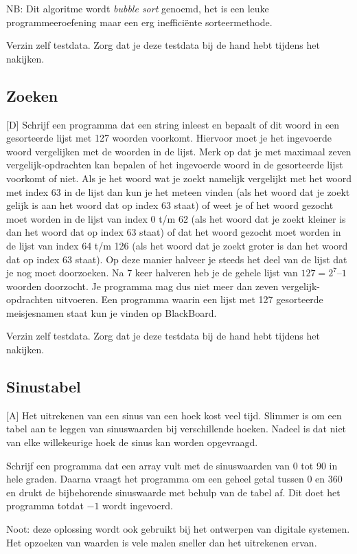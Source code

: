 \documentclass[a4paper,10pt,fleqn,twoside]{article}
\begin{document}
NB: Dit algoritme wordt \textsl{bubble sort} genoemd, het is een leuke programmeeroefening maar een erg inefficiënte sorteermethode.

Verzin zelf testdata. Zorg dat je deze testdata bij de hand hebt tijdens het nakijken.

\subsection{Zoeken}[D]
Schrijf een programma dat een string inleest en bepaalt of dit woord in een gesorteerde lijst met 127 woorden voorkomt. Hiervoor moet je het ingevoerde woord vergelijken met de woorden in de lijst. Merk op dat je met maximaal zeven vergelijk-opdrachten kan bepalen of het ingevoerde woord in de gesorteerde lijst voorkomt of niet. Als je het woord wat je zoekt namelijk vergelijkt met het woord met index 63 in de lijst dan kun je het meteen vinden (als het woord dat je zoekt gelijk is aan het woord dat op index 63 staat) of weet je of het woord gezocht moet worden in de lijst van index 0 t/m 62 (als het woord dat je zoekt kleiner is dan het woord dat op index 63 staat) of dat het woord gezocht moet worden in de lijst van index 64 t/m 126 (als het woord dat je zoekt groter is dan het woord dat op index 63 staat). Op deze manier halveer je steeds het deel van de lijst dat je nog moet doorzoeken. Na 7 keer halveren heb je de gehele lijst van $127 = 2^7 – 1$ woorden doorzocht. Je programma mag dus niet meer dan zeven vergelijk-opdrachten uitvoeren. Een programma waarin een lijst met 127 gesorteerde meisjesnamen staat kun je vinden op BlackBoard. 

Verzin zelf testdata. Zorg dat je deze testdata bij de hand hebt tijdens het nakijken.

\subsection{Sinustabel}[A]
Het uitrekenen van een sinus van een hoek kost veel tijd. Slimmer is om een tabel aan te leggen van sinuswaarden bij verschillende hoeken. Nadeel is dat niet van elke willekeurige hoek de sinus kan worden opgevraagd.

Schrijf een programma dat een array vult met de sinuswaarden van 0 tot 90 in hele graden. Daarna vraagt het programma om een geheel getal tussen 0 en 360 en drukt de bijbehorende sinuswaarde met behulp van de tabel af. Dit doet het programma totdat $-1$ wordt ingevoerd.

Noot: deze oplossing wordt ook gebruikt bij het ontwerpen van digitale systemen. Het opzoeken van waarden is vele malen sneller dan het uitrekenen ervan.
\end{document}
